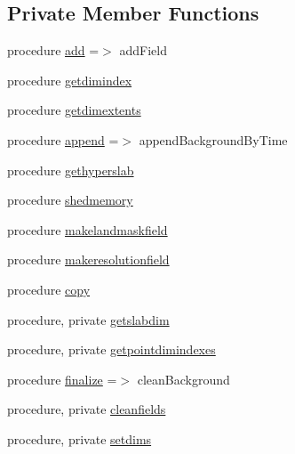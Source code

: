 \subsection*{Private Member Functions}
\begin{DoxyCompactItemize}
\item 
procedure \mbox{\hyperlink{structbackground__mod_1_1background__class_adbf91df5efe766dead76d836cb0663c4}{add}} =$>$ add\+Field
\item 
procedure \mbox{\hyperlink{structbackground__mod_1_1background__class_a91992b0ccc0956daecda2f250ba934d6}{getdimindex}}
\item 
procedure \mbox{\hyperlink{structbackground__mod_1_1background__class_adecdce1f527c3ccb5f57d8b267023f4f}{getdimextents}}
\item 
procedure \mbox{\hyperlink{structbackground__mod_1_1background__class_a2d01f214966eea8a261c03a39d36743a}{append}} =$>$ append\+Background\+By\+Time
\item 
procedure \mbox{\hyperlink{structbackground__mod_1_1background__class_acb4a97a67f51e509fade50ed4b085f07}{gethyperslab}}
\item 
procedure \mbox{\hyperlink{structbackground__mod_1_1background__class_adbeedbb2d82107fe8dca02b72ffadcec}{shedmemory}}
\item 
procedure \mbox{\hyperlink{structbackground__mod_1_1background__class_a0ecab872ceea6e2ad4274daa4670459e}{makelandmaskfield}}
\item 
procedure \mbox{\hyperlink{structbackground__mod_1_1background__class_a7509bacd43458ebee54bb0092422f26d}{makeresolutionfield}}
\item 
procedure \mbox{\hyperlink{structbackground__mod_1_1background__class_a07f5655551267d4801e1e87a1d188420}{copy}}
\item 
procedure, private \mbox{\hyperlink{structbackground__mod_1_1background__class_ac7e39271ba1838a3f1548f10ff658de1}{getslabdim}}
\item 
procedure, private \mbox{\hyperlink{structbackground__mod_1_1background__class_a12daf122cea65ebd459e8507ae2389fa}{getpointdimindexes}}
\item 
procedure \mbox{\hyperlink{structbackground__mod_1_1background__class_aa41872e2623f1fb7da1fd4b930e6b100}{finalize}} =$>$ clean\+Background
\item 
procedure, private \mbox{\hyperlink{structbackground__mod_1_1background__class_ae4dfe47f7233a9755631095933ed6276}{cleanfields}}
\item 
procedure, private \mbox{\hyperlink{structbackground__mod_1_1background__class_a5a4418427175db3e0d549fc328369993}{setdims}}

\end{DoxyCompactItemize}
